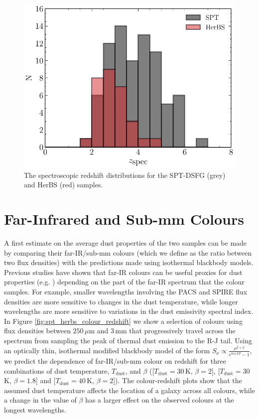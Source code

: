 \begin{figure}
	\centering
	\includegraphics[width=0.8\columnwidth]{Figures/Figure_4_2.pdf}
	\caption[Spectroscopic redshift distributions of HerBS and SPT-DSFG samples]{The spectroscopic redshift distributions for the SPT-DSFG (grey) and HerBS (red) samples.}
	\label{fig:spt_herbs_redshift}
\end{figure}

\section{Far-Infrared and Sub-mm Colours}
\label{sec:fir_submm_colours}

A first estimate on the average dust properties of the two samples can be made by comparing their far-IR/sub-mm colours (which we define as the ratio between two flux densities) with the predictions made using isothermal blackbody models. Previous studies have shown that far-IR colours can be useful proxies for dust properties (e.g. \citealt{Boselli_2010, Boselli_2012, Remy-Ruyer_2013, Smith_2019}) depending on the part of the far-IR spectrum that the colour samples. For example, smaller wavelengths involving the PACS and SPIRE flux densities are more sensitive to changes in the dust temperature, while longer wavelengths are more sensitive to variations in the dust emissivity spectral index. In Figure \ref{fig:spt_herbs_colour_redshift} we show a selection of colours using flux densities between $250\,\mu$m and $3\,$mm that progressively travel across the spectrum from sampling the peak of thermal dust emission to the R-J tail. Using an optically thin, isothermal modified blackbody model of the form $S_\nu \propto \frac{\nu^{\beta+3}}{e^{h \nu/kT} - 1}$, we predict the dependence of far-IR/sub-mm colour on redshift for three combinations of dust temperature, $T_{\textrm{dust}}$, and $\beta$ ([$T_{\textrm{dust}} = 30\,$K, $\beta = 2$], [$T_{\textrm{dust}} = 30\,$K, $\beta = 1.8$] and [$T_{\textrm{dust}} = 40\,$K, $\beta = 2$]). The colour-redshift plots show that the assumed dust temperature affects the location of a galaxy across all colours, while a change in the value of $\beta$ has a larger effect on the observed colours at the longest wavelengths.

